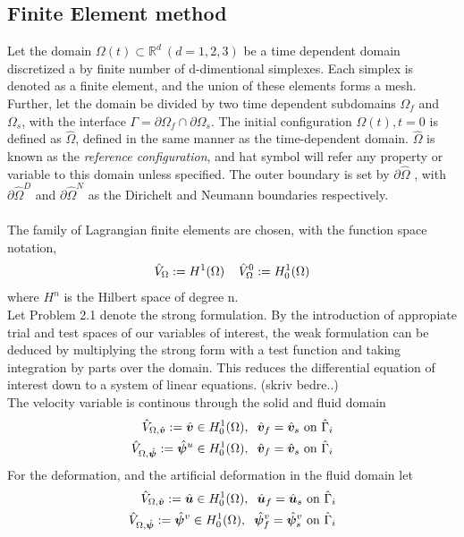 \subsection{Finite Element method}
Let the domain $\Omega(t) \subset \mathbb{R}^d \ (d = 1, 2, 3) $  be a time dependent domain discretized a by finite number of d-dimentional simplexes.  Each simplex is denoted as a finite element, and the union of these elements forms a mesh. Further, let the domain be divided by two time dependent subdomains $\Omega_f$ and $\Omega_s$, with the interface $\Gamma = \partial \Omega_f \cap \partial \Omega_s$. The initial configuration $\Omega(t), t = 0 $ is defined as $\hat{\Omega}$, defined in the same manner as the time-dependent domain. $\hat{\Omega}$ is  known as the \textit{reference configuration}, and hat symbol will refer any property or variable to this domain unless specified. The outer boundary is set by $\partial \hat{\Omega}$ , with $\partial \hat{\Omega}^D$ and $\partial \hat{\Omega}^N$ as the Dirichelt and Neumann boundaries respectively. \\ \\

The family of Lagrangian finite elements are chosen, with the function space notation,
\begin{align*}
\hat{V}_{\Omega} := H^1(\Omega) \hspace{4mm} 
\hat{V}_{\Omega}^0 := H_0^1(\Omega)  
\end{align*}
where $H^n$ is the Hilbert space of degree n. \\
Let Problem 2.1 denote the strong formulation. By the introduction of appropiate trial and test spaces of our variables of interest, the weak formulation can be deduced by multiplying the strong form with a test function and taking integration by parts over the domain.  This reduces the differential equation of interest down to a system of linear equations. (skriv bedre..) \\
The velocity variable is continous through the solid and fluid domain
\begin{align*}
\hat{V}_{\Omega, \hat{\bm{v}}} := \hat{\bm{v}} \in H_0^1(\Omega), \hspace{2mm} 
\hat{\bm{v}}_f = \hat{\bm{v}}_s \ \text{on} \ \hat{\Gamma}_i \\
\hat{V}_{\Omega, \hat{\bm{\psi}}} := \hat{\bm{\psi}}^u \in H_0^1(\Omega), \hspace{2mm} 
\hat{\bm{v}}_f = \hat{\bm{v}}_s \ \text{on} \ \hat{\Gamma}_i 
\end{align*}
For the deformation, and the artificial deformation in the fluid domain let
\begin{align*}
\hat{V}_{\Omega, \hat{\bm{v}}} := \hat{\bm{u}} \in H_0^1(\Omega), \hspace{2mm} 
\hat{\bm{u}}_f = \hat{\bm{u}}_s \ \text{on} \ \hat{\Gamma}_i \\
\hat{V}_{\Omega, \hat{\bm{\psi}}} := \hat{\bm{\psi}}^v \in H_0^1(\Omega), \hspace{2mm} 
\hat{\bm{\psi}}_f^v = \hat{\bm{\psi}}_s^v \ \text{on} \ \hat{\Gamma}_i 
\end{align*}

